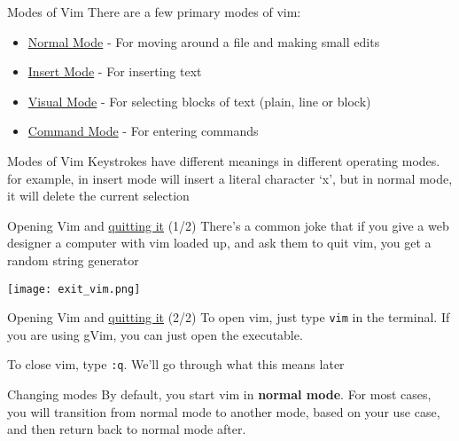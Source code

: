 \documentclass[12pt]{beamer}
\begin{document}
\begin{frame}{Modes of Vim}
    There are a few primary modes of vim:
    \begin{itemize}
        \item \underline{Normal Mode} - For moving around a file and making small edits
        \item \underline{Insert Mode} - For inserting text
        \item \underline{Visual Mode} - For selecting blocks of text (plain, line or block)
        \item \underline{Command Mode} - For entering commands
    \end{itemize}{}
\end{frame}{}

\begin{frame}{Modes of Vim}
    Keystrokes have different meanings in different operating modes. for example,  in insert mode will insert a literal character ‘x’, but in normal mode, it will delete the current selection
\end{frame}{}

\begin{frame}{Opening Vim and \underline{quitting it} (1/2)}
    There's a common joke that if you give a web designer a computer with vim loaded up, and ask them to quit vim,
    you get a random string generator

    \texttt{[image: exit\_vim.png]}
\end{frame}

\begin{frame}{Opening Vim and \underline{quitting it} (2/2)}
    To open vim, just type \texttt{vim} in the terminal. If you are using gVim, you can just open the executable.

    To close vim, type \texttt{:q}. We'll go through what this means later
\end{frame}{}

\begin{frame}{Changing modes}
    By default, you start vim in \textbf{normal mode}. For most cases, you will transition from normal mode to
    another mode, based on your use case, and then return back to normal mode after.
\end{frame}{}
\end{document}
